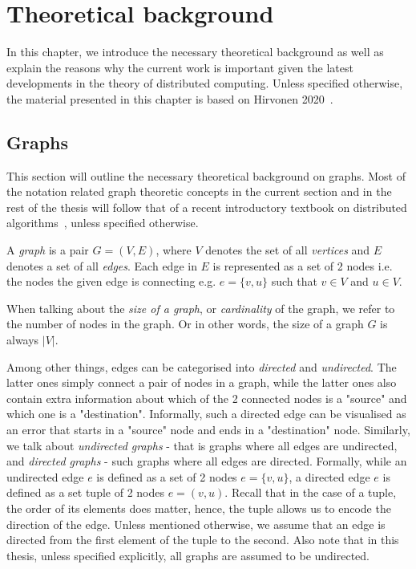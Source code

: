 \chapter{Theoretical background}
\label{chapter:background}

In this chapter, we introduce the necessary theoretical background as well as
explain the reasons why the current work is important given the latest
developments in the theory of distributed computing. Unless specified otherwise,
the material presented in this chapter is based on Hirvonen 2020~\cite{Hirvonen2020}.

\section{Graphs}

This section will outline the necessary theoretical background on graphs. 
Most of the notation related graph theoretic concepts in the current
section and in the rest of the thesis will follow that of
a recent introductory textbook on distributed algorithms~\cite{Hirvonen2020},
unless specified otherwise.

A \emph{graph} is a pair $G = (V, E)$, where $V$ denotes the set of all \emph{vertices}
and $E$ denotes a set of all \emph{edges}. Each edge in $E$ is represented as a set of
2 nodes i.e. the nodes the given edge is connecting e.g. $e = \{v, u\}$ such that 
$v \in V$ and $u \in V$.

When talking about the \emph{size of a graph}, or \emph{cardinality} of the graph, we refer
to the number of nodes in the graph. Or in other words, the size of a graph $G$
is always $|V|$.

Among other things, edges can be categorised into \emph{directed} and \emph{undirected}.
The latter ones simply connect a pair of nodes in a graph, while the latter
ones also contain extra information about which of the 2 connected nodes is
a "source" and which one is a "destination". Informally, such a directed edge
can be visualised as an error that starts in a "source" node and ends in a 
"destination" node.  Similarly, we talk about \emph{undirected graphs} - that is graphs
where all edges are undirected, and \emph{directed graphs} - such graphs where all
edges are directed. Formally, while an undirected edge $e$ is defined as a
set of 2 nodes $e = \{v, u\}$, a directed edge $e$ is defined as a set tuple
of 2 nodes $e = (v, u)$. Recall that in the case of a tuple, the order of its
elements does matter, hence, the tuple allows us to encode the direction of
the edge. Unless mentioned otherwise, we assume that an edge is directed
from the first element of the tuple to the second. Also note that in this
thesis, unless specified explicitly, all graphs are assumed to be undirected.

